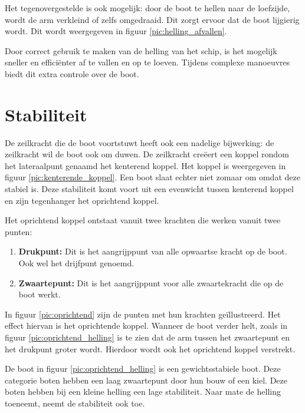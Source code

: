 Het tegenovergestelde is ook mogelijk: door de boot te hellen naar de loefzijde, wordt de arm verkleind of zelfs omgedraaid. Dit zorgt ervoor dat de boot lijgierig wordt. Dit wordt weergegeven in figuur \ref{pic:helling_afvallen}.


Door correct gebruik te maken van de helling van het schip, is het mogelijk sneller en efficiënter af te vallen en op te loeven. Tijdens complexe manoeuvres biedt dit extra controle over de boot.  

\section{Stabiliteit}
De zeilkracht die de boot voortstuwt heeft ook een nadelige bijwerking: de zeilkracht wil de boot ook om duwen. De zeilkracht creëert een koppel rondom het lateraalpunt genaamd het kenterend koppel. Het koppel is weergegeven in figuur \ref{pic:kenterende_koppel}. Een boot slaat echter niet zomaar om omdat deze stabiel is. Deze stabiliteit komt voort uit een evenwicht tussen kenterend koppel en zijn tegenhanger het oprichtend koppel. 

Het oprichtend koppel ontstaat vanuit twee krachten die werken vanuit twee punten:
\begin{enumerate}
	\item \textbf{Drukpunt:} Dit is het aangrijppunt van alle opwaartse kracht op de boot. Ook wel het drijfpunt genoemd.
	\item \textbf{Zwaartepunt:} Dit is het aangrijppunt voor alle zwaartekracht die op de boot werkt.
\end{enumerate}

In figuur \ref{pic:oprichtend} zijn de punten met hun krachten geïllustreerd. Het effect hiervan is het oprichtende koppel. Wanneer de boot verder helt, zoals in figuur \ref{pic:oprichtend_helling} is te zien dat de arm tussen het zwaartepunt en het drukpunt groter wordt. Hierdoor wordt ook het oprichtend koppel verstrekt. 

De boot in figuur \ref{pic:oprichtend_helling} is een gewichtsstabiele boot. Deze categorie boten hebben een laag zwaartepunt door hun bouw of een kiel. Deze boten hebben bij een kleine helling een lage stabiliteit. Naar mate de helling toeneemt, neemt de stabiliteit ook toe. 

